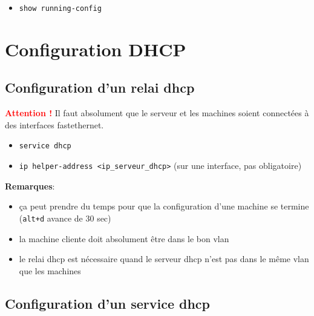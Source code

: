 \documentclass[a4paper]{article}
\begin{document}
\begin{itemize}[label=\textbf{–}]
    \item \texttt{show running-config}
\end{itemize}










\section{Configuration DHCP}





\subsection{Configuration d'un relai dhcp}



\textcolor{red}{\textbf{Attention !}} Il faut absolument que le serveur et les machines soient connectées à des interfaces fastethernet.
\begin{itemize}[label=\textbf{–}]
    \item \texttt{service dhcp}
    \item \texttt{ip helper-address <ip\_serveur\_dhcp>} (sur une interface, pas obligatoire)
\end{itemize}
\textbf{Remarques}:
\begin{itemize}
    \item ça peut prendre du temps pour que la configuration d’une machine se termine (\texttt{alt+d} avance de 30 sec)
    \item la machine cliente doit absolument être dans le bon vlan
    \item le relai dhcp est nécessaire quand le serveur dhcp n'est pas dans le même vlan que les machines
\end{itemize}





\subsection{Configuration d'un service dhcp}
\end{document}
